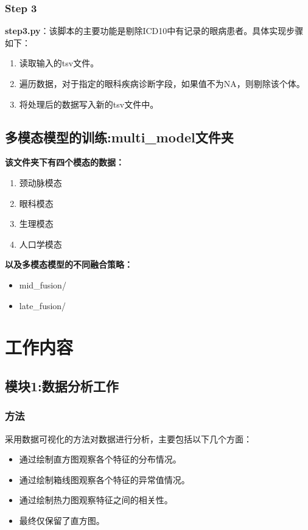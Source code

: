 \documentclass[UTF8]{report}
\theoremstyle{MyLineTheoremStyle} %
\theoremstyle{MyBlockTheoremStyle} %
\theoremstyle{MySubsubsectionStyle} %
\begin{document}
\subsection*{Step 3}

\textbf{step3.py}：该脚本的主要功能是剔除ICD10中有记录的眼病患者。具体实现步骤如下：
\begin{enumerate}
    \item 读取输入的tsv文件。
    \item 遍历数据，对于指定的眼科疾病诊断字段，如果值不为NA，则剔除该个体。
    \item 将处理后的数据写入新的tsv文件中。
\end{enumerate}

\section{多模态模型的训练:multi\_model文件夹}

\textbf{该文件夹下有四个模态的数据：}
\begin{enumerate}
    \item 颈动脉模态
    \item 眼科模态
    \item 生理模态
    \item 人口学模态
\end{enumerate}

\textbf{以及多模态模型的不同融合策略：}
\begin{itemize}
    \item mid\_fusion/
    \item late\_fusion/
\end{itemize}


\chapter{工作内容}

\section{模块1:数据分析工作}

\subsection*{方法}
采用数据可视化的方法对数据进行分析，主要包括以下几个方面：
\begin{itemize}
    \item 通过绘制直方图观察各个特征的分布情况。
    \item 通过绘制箱线图观察各个特征的异常值情况。
    \item 通过绘制热力图观察特征之间的相关性。
    \item 最终仅保留了直方图。
\end{itemize}
\end{document}
